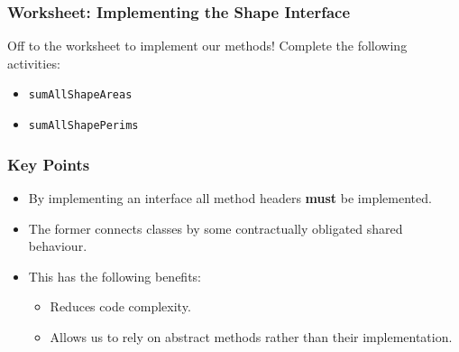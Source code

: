 \documentclass{beamer}
\begin{document}

\begin{frame}
    \frametitle{Worksheet: Implementing the Shape Interface}
    Off to the worksheet to implement our methods!
    Complete the following activities:
    \begin{itemize}
        \item \lstinline|sumAllShapeAreas|
        \item \lstinline|sumAllShapePerims|
    \end{itemize}
\end{frame}

\begin{frame}
    \frametitle{Key Points}
    \begin{itemize}
        \item By implementing an interface all method headers \textbf{must} be implemented.
            
        \item The former connects classes by some contractually obligated shared behaviour.
            
        \item This has the following benefits:
            \begin{itemize}
                \item Reduces code complexity.
                \item Allows us to rely on abstract methods rather than their implementation.
            \end{itemize}
    \end{itemize}
\end{frame}
\end{document}
